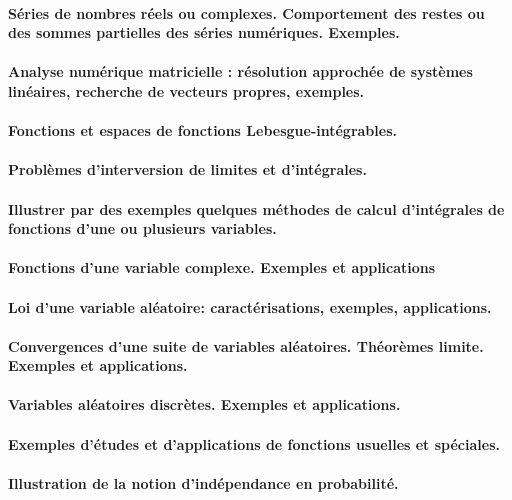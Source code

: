 \paragraph{Séries  de  nombres  réels  ou  complexes. Comportement  des  restes  ou  des sommes partielles des séries numériques. Exemples.}
\paragraph{Analyse numérique matricielle : résolution approchée de systèmes linéaires, recherche de vecteurs propres, exemples.}
\paragraph{Fonctions et espaces de fonctions Lebesgue-intégrables.}
\paragraph{Problèmes d'interversion de limites et d'intégrales.}
\paragraph{Illustrer par des exemples quelques méthodes de calcul d'intégrales de fonctions d'une ou plusieurs variables.}
\paragraph{Fonctions d'une variable complexe. Exemples et applications}
\paragraph{Loi d'une variable aléatoire: caractérisations, exemples, applications.}
\paragraph{Convergences d'une suite de variables aléatoires. Théorèmes limite. Exemples et applications.}
\paragraph{Variables aléatoires discrètes. Exemples et applications.}
\paragraph{Exemples d'études et d'applications de fonctions usuelles et spéciales.}
\paragraph{Illustration de la notion d'indépendance en probabilité.}

